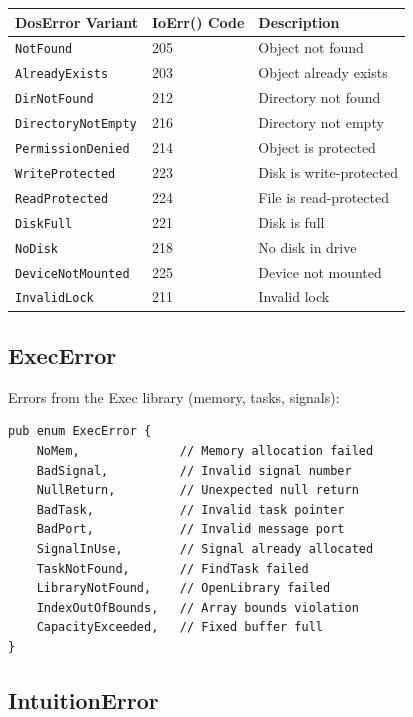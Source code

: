 \begin{center}
\begin{tabular}{lll}
\textbf{DosError Variant} & \textbf{IoErr() Code} & \textbf{Description} \\
\hline
\texttt{NotFound} & 205 & Object not found \\
\texttt{AlreadyExists} & 203 & Object already exists \\
\texttt{DirNotFound} & 212 & Directory not found \\
\texttt{DirectoryNotEmpty} & 216 & Directory not empty \\
\texttt{PermissionDenied} & 214 & Object is protected \\
\texttt{WriteProtected} & 223 & Disk is write-protected \\
\texttt{ReadProtected} & 224 & File is read-protected \\
\texttt{DiskFull} & 221 & Disk is full \\
\texttt{NoDisk} & 218 & No disk in drive \\
\texttt{DeviceNotMounted} & 225 & Device not mounted \\
\texttt{InvalidLock} & 211 & Invalid lock \\
\end{tabular}
\end{center}

\subsection{ExecError}

Errors from the Exec library (memory, tasks, signals):

\begin{lstlisting}
pub enum ExecError {
    NoMem,              // Memory allocation failed
    BadSignal,          // Invalid signal number
    NullReturn,         // Unexpected null return
    BadTask,            // Invalid task pointer
    BadPort,            // Invalid message port
    SignalInUse,        // Signal already allocated
    TaskNotFound,       // FindTask failed
    LibraryNotFound,    // OpenLibrary failed
    IndexOutOfBounds,   // Array bounds violation
    CapacityExceeded,   // Fixed buffer full
}
\end{lstlisting}

\subsection{IntuitionError}

